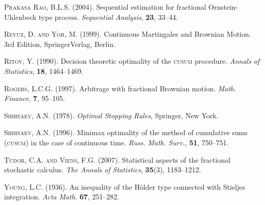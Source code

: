 \documentclass[11pt,reqno]{amsart}
\theoremstyle{remark}
\begin{document}
\begin{thebibliography}{99}
 \textsc{Prakasa Rao, B.L.S.} (2004). Sequential estimation for fractional Ornstein-Uhlenbeck type process. {\em  Sequential Analysis}, \textbf{23}, 33--44.

 \textsc{Revuz, D. and Yor, M.} (1999). Continuous Martingales and Brownian Motion. 3rd Edition, SpringerVerlag, Berlin.

 \textsc{Ritov, Y.} (1990). Decision theoretic optimality of the \textsc{cusum} procedure. {\em Annals of Statistics}, \textbf{18}, 1464--1469.

 \textsc{Rogers, L.C.G.} (1997). Arbitrage with fractional Brownian motion. \emph{Math. Finance}, \textbf{7}, 95--105.

 \textsc{Shiryaev, A.N.} (1978). {\em Optimal Stopping Rules}, Springer, New York.

 \textsc{Shiryaev, A.N.} (1996). Minimax optimality of the method of cumulative sums (\textsc{cusum}) in the case of continuous time. {\em Russ. Math. Surv.}, \textbf{51}, 750--751.

 \textsc{Tudor, C.A. and Viens, F.G.} (2007). Statistical aspects of the fractional stochastic calculus. {\em The Annals of Statistics}, \textbf{35}(3), 1183--1212.

 \textsc{Young, L.C.} (1936). An inequality of the H\"older type connected with Stieljes integration. \emph{Acta Math.} \textbf{67}, 251--282.

\end{thebibliography}
\end{document}
